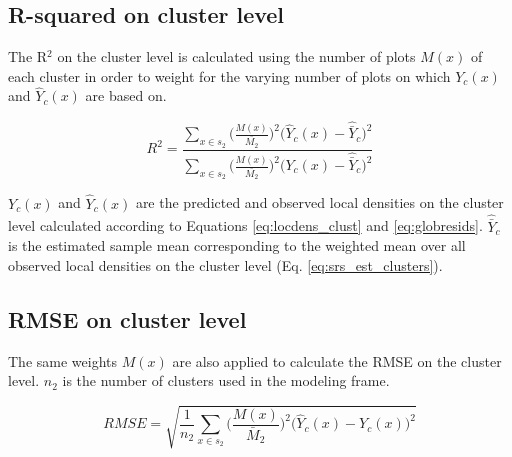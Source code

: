\documentclass[remotesensing,article,submit,moreauthors,pdftex,10pt,a4paper]{mdpi}
\begin{document}
\appendix

\section{}
\subsection*{R-squared on cluster level}

The R$^2$ on the cluster level is calculated using the number of plots $M(x)$ of each cluster in order to weight for the varying number of plots on which $Y_c(x)$ and $\hat{Y}_{c}(x)$ are based on. 

\begin{equation*}\label{eq:R_squared_clust}
R^2 =  \frac{\sum_{x \in s_2} \Big(\frac{M(x)}{\bar{M_2}}\Big)^2 \Big(\hat{Y}_{c}(x)-\hat{\bar{Y}}_c\Big)^2}{\sum_{x \in s_2} \Big(\frac{M(x)}{\bar{M_2}}\Big)^2 \Big(Y_{c}(x)-\hat{\bar{Y}}_c\Big)^2}
\end{equation*}

\noindent $Y_c(x)$ and $\hat{Y}_{c}(x)$ are the predicted and observed local densities on the cluster level calculated according to Equations \ref{eq:locdens_clust} and \ref{eq:globresids}. $\hat{\bar{Y}}_c$ is the estimated sample mean corresponding to the weighted mean over all observed local densities on the cluster level (Eq. \ref{eq:srs_est_clusters}).\par

\subsection*{RMSE on cluster level}

The same weights $M(x)$ are also applied to calculate the RMSE on the cluster level. $n_2$ is the number of clusters used in the modeling frame.

\begin{equation*}\label{eq:RMSE_clust}
RMSE= \sqrt{\frac{1}{n_{2}}  \sum_{x \in s_2} \Big(\frac{M(x)}{\bar{M}_2}\Big)^2 \Big(\hat{Y}_{c}(x)-Y_c(x)\Big)^2}
\end{equation*}
\end{document}
